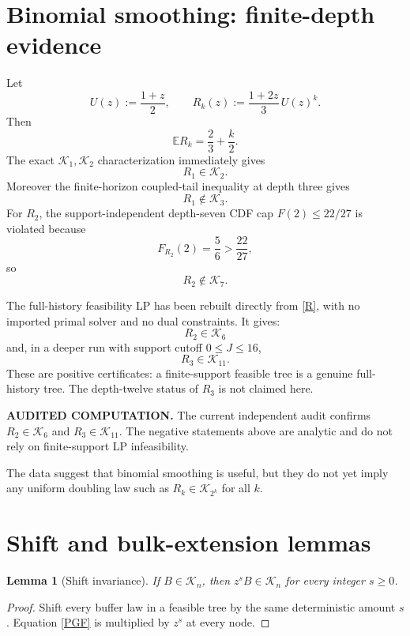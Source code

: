 \documentclass[11pt,a4paper]{article}
\newtheorem{lemma}[theorem]{Lemma}
\newcommand{\E}{\mathbb E}
\newcommand{\cK}{\mathcal K}
\newcommand{\1}{\mathbf 1}
\newcommand{\audit}[1]{\textbf{AUDITED COMPUTATION.} #1}
\begin{document}
\section{Binomial smoothing: finite-depth evidence}

Let
\[
U(z):=\frac{1+z}{2},
\qquad
R_k(z):=\frac{1+2z}{3}\,U(z)^k.
\]
Then
\[
\E R_k=\frac23+\frac{k}{2}.
\]
The exact \(\cK_1,\cK_2\) characterization immediately gives
\[
R_1\in\cK_2.
\]
Moreover the finite-horizon coupled-tail inequality at depth three gives
\[
R_1\notin\cK_3.
\]
For \(R_2\), the support-independent depth-seven CDF cap
\(F(2)\le22/27\) is violated because
\[
F_{R_2}(2)=\frac56>\frac{22}{27},
\]
so
\[
R_2\notin\cK_7.
\]

The full-history feasibility LP has been rebuilt directly from \eqref{R}, with
no imported primal solver and no dual constraints.  It gives:
\[
\boxed{R_2\in\cK_6}
\]
and, in a deeper run with support cutoff \(0\le J\le16\),
\[
\boxed{R_3\in\cK_{11}}.
\]
These are positive certificates: a finite-support feasible tree is a genuine
full-history tree.  The depth-twelve status of \(R_3\) is not claimed here.

\audit{The current independent audit confirms \(R_2\in\cK_6\) and
\(R_3\in\cK_{11}\).  The negative statements above are analytic and do not rely
on finite-support LP infeasibility.}

The data suggest that binomial smoothing is useful, but they do not yet imply
any uniform doubling law such as \(R_k\in\cK_{2^k}\) for all \(k\).

\section{Shift and bulk-extension lemmas}

\begin{lemma}[Shift invariance]
If \(B\in\cK_n\), then \(z^sB\in\cK_n\) for every integer \(s\ge0\).
\end{lemma}

\begin{proof}
Shift every buffer law in a feasible tree by the same deterministic amount
\(s\).  Equation \eqref{PGF} is multiplied by \(z^s\) at every node.
\end{proof}
\end{document}
